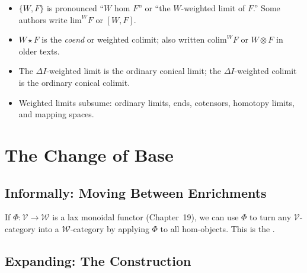 \begin{howtosay}
\begin{itemize}
  \item $\{W, F\}$ is pronounced ``$W$ hom $F$'' or ``the $W$-weighted limit
        of $F$.'' Some authors write $\mathrm{lim}^W F$ or $[W, F]$.
  \item $W \star F$ is the \emph{coend} or weighted colimit; also written
        $\mathrm{colim}^W F$ or $W \otimes F$ in older texts.
  \item The $\Delta I$-weighted limit is the ordinary conical limit; the
        $\Delta I$-weighted colimit is the ordinary conical colimit.
  \item Weighted limits subsume: ordinary limits, ends, cotensors, homotopy
        limits, and mapping spaces.
\end{itemize}
\end{howtosay}


\section{The Change of Base}
\label{sec:change-of-base}

\subsection{Informally: Moving Between Enrichments}

If $\Phi : \mathcal{V} \to \mathcal{W}$ is a lax monoidal functor (Chapter~19),
we can use $\Phi$ to turn any $\mathcal{V}$-category into a $\mathcal{W}$-category
by applying $\Phi$ to all hom-objects. This is the .

\subsection{Expanding: The Construction}

